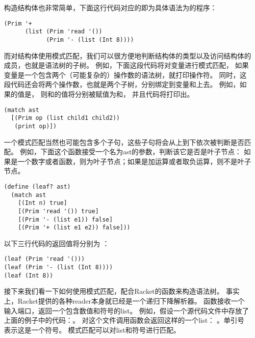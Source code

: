 构造结构体也非常简单，下面这行代码对应的即为具体语法为的程序：
\begin{multilinecode}
\begin{lstlisting}
(Prim '+
      (list (Prim 'read '())
            (Prim '- (list (Int 8))))
\end{lstlisting}
\end{multilinecode}

而对结构体使用模式匹配，我们可以很方便地判断结构体的类型以及访问结构体的成员，也就是语法树的子树。
例如，下面这段代码将对变量进行模式匹配，
如果变量是一个包含两个（可能复杂的）操作数的语法树，就打印操作符。
同时，这段代码还会将两个操作数，也就是两个子树，分别绑定到变量和上去。
例如，如果的值是，
则和的值将分别被赋值为和，
并且代码将打印出\code{+}。
\begin{multilinecode}
\begin{lstlisting}
(match ast
  [(Prim op (list child1 child2))
   (print op)])
\end{lstlisting}
\end{multilinecode}

一个模式匹配当然也可能包含多个子句，这些子句将会从上到下依次被判断是否匹配。
例如，下面这个函数接受一个名为ast的参数，判断该它是否是叶子节点：
如果是一个数字或者函数，则为叶子节点；如果是加运算或者取负运算，则不是叶子节点。
\begin{multilinecode}
\begin{lstlisting}
(define (leaf? ast)
  (match ast
    [(Int n) true]
    [(Prim 'read '()) true]
    [(Prim '- (list e1)) false]
    [(Prim '+ (list e1 e2)) false]))
\end{lstlisting}
\end{multilinecode}

以下三行代码的返回值将分别为 ：
\begin{multilinecode}
\begin{lstlisting}
(leaf (Prim 'read '()))
(leaf (Prim '- (list (Int 8))))
(leaf (Int 8))
\end{lstlisting}
\end{multilinecode}

接下来我们看一下如何使用模式匹配，配合Racket的函数来构造语法树。
事实上，Racket提供的各种reader本身就已经是一个递归下降解析器。
函数接收一个输入端口，返回一个包含数值和符号的list。
例如，假设一个源代码文件中存放了上面的例子中的代码：。
对这个文件调用函数会返回这样的一个list：
。单引号表示这是一个符号。
模式匹配可以对list和符号进行匹配。

